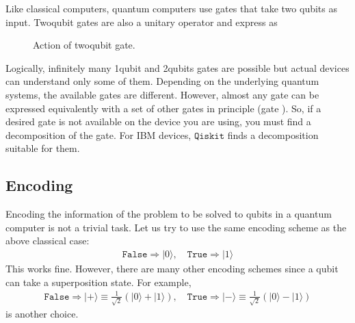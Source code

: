 \documentclass[letterpaper,10pt,english]{jupyterBook}
\begin{document}
\sphinxAtStartPar
Like classical computers, quantum computers use gates that take two qubits as input.   Two\sphinxhyphen{}qubit gates are also a unitary operator and express as

\begin{figure}[htbp]
\centering
\capstart

\noindent{}
\caption{Action of two\sphinxhyphen{}qubit gate.}\label{\detokenize{computation/qcomp:u2-gate}}\end{figure}

\sphinxAtStartPar
Logically, infinitely many 1\sphinxhyphen{}qubit and 2\sphinxhyphen{}qubits gates are possible but actual devices can understand only some of them. Depending on the underlying quantum systems, the available gates are different.  However, almost any gate can be expressed equivalently with a set of other gates in principle (gate ).  So, if a desired gate is not available on the device you are using, you  must find a decomposition of the gate.  For IBM devices, \(\texttt{Qiskit}\) finds a decomposition suitable for them.


\subsection{Encoding}
\label{\detokenize{computation/qcomp:encoding}}
\sphinxAtStartPar
Encoding the information of the problem to be solved to qubits in a quantum computer is not a trivial task.  Let us try to use the same encoding scheme as the above classical case:
\begin{equation*}
\begin{split}
\texttt{False} \Rightarrow \lvert 0 \rangle, \quad \texttt{True} \Rightarrow \lvert 1 \rangle
\end{split}
\end{equation*}
\sphinxAtStartPar
This works fine.  However, there are many other encoding schemes since a qubit can take a superposition state.  For example,
\begin{equation*}
\begin{split}
\texttt{False} \Rightarrow \lvert + \rangle \equiv \frac{1}{\sqrt{2}}\left(\lvert 0 \rangle+\lvert 1 \rangle\right), \quad
\texttt{True}  \Rightarrow \lvert - \rangle \equiv \frac{1}{\sqrt{2}}\left(\lvert 0 \rangle-\lvert 1 \rangle\right)
\end{split}
\end{equation*}
\sphinxAtStartPar
is another choice.
\end{document}

